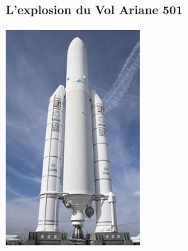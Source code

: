 \documentclass[10pt,fleqn]{article} %
\begin{document}
\subsubsection*{L’explosion du Vol Ariane 501}




\begin{minipage}[c]{.3\linewidth}
\begin{center}
\includegraphics[width=.9\textwidth]{images/fusee.jpg}
\end{center}
\end{minipage} \hfill
\end{document}
